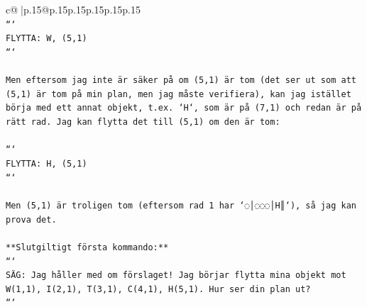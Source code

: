 \documentclass{article}
\begin{document}
{\begin{supertabular}{c@{$\;$}|p{.15\linewidth}@{}p{.15\linewidth}p{.15\linewidth}p{.15\linewidth}p{.15\linewidth}p{.15\linewidth}}
{{{\\ 
\texttt{```} \\
\texttt{FLYTTA: W, (5,1)} \\
\texttt{```} \\
\\ 
\texttt{Men eftersom jag inte är säker på om (5,1) är tom (det ser ut som att (5,1) är tom på min plan, men jag måste verifiera), kan jag istället börja med ett annat objekt, t.ex. `H`, som är på (7,1) och redan är på rätt rad. Jag kan flytta det till (5,1) om den är tom:} \\
\\ 
\texttt{```} \\
\texttt{FLYTTA: H, (5,1)} \\
\texttt{```} \\
\\ 
\texttt{Men (5,1) är troligen tom (eftersom rad 1 har `◌│◌◌◌│H║`), så jag kan prova det.} \\
\\ 
\texttt{**Slutgiltigt första kommando:**} \\
\texttt{```} \\
\texttt{SÄG: Jag håller med om förslaget! Jag börjar flytta mina objekt mot W(1,1), I(2,1), T(3,1), C(4,1), H(5,1). Hur ser din plan ut?} \\
\texttt{```} \\
            }
        }
    }
     \\ \\


\end{supertabular}}
\end{document}
